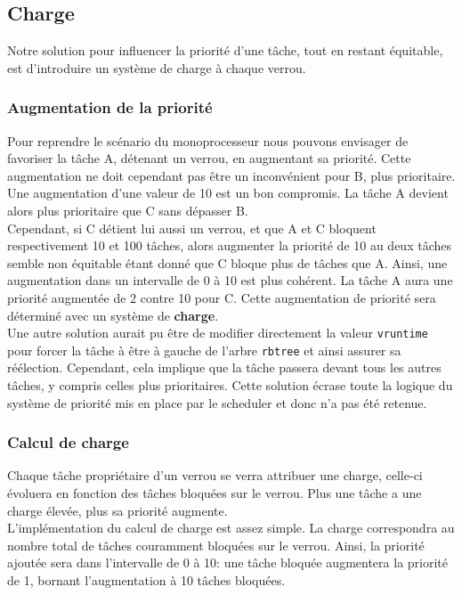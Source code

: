 \subsection{Charge}

Notre solution pour influencer la priorité d'une tâche, tout en restant équitable,
est d'introduire un système de charge à chaque verrou.

\subsubsection{Augmentation de la priorité}

Pour reprendre le scénario du monoprocesseur nous pouvons envisager de favoriser la tâche A, détenant un verrou,
en augmentant sa priorité. Cette augmentation ne doit cependant pas être un inconvénient pour B,
plus prioritaire. Une augmentation d'une valeur de 10 est un bon compromis. La tâche A
devient alors plus prioritaire que C sans dépasser B.
\\

Cependant, si C détient lui aussi un verrou, et que A et C bloquent respectivement 
10 et 100 tâches, alors augmenter la priorité de 10 au deux tâches semble non équitable
étant donné que C bloque plus de tâches que A. Ainsi, une augmentation dans un
intervalle de 0 à 10 est plus cohérent. La tâche A aura une priorité augmentée
de 2 contre 10 pour C. Cette augmentation de priorité sera déterminé
avec un système de \textbf{charge}.
\\

Une autre solution aurait pu être de modifier directement la valeur \verb|vruntime|
pour forcer la tâche à être à gauche de l'arbre \verb|rbtree| et ainsi assurer sa
réélection. Cependant, cela implique que la tâche passera devant tous les autres tâches,
y compris celles plus prioritaires. Cette solution écrase toute la logique du système
de priorité mis en place par le scheduler et donc n'a pas été retenue.


\subsubsection{Calcul de charge}

Chaque tâche propriétaire d'un verrou se verra attribuer une charge, celle-ci évoluera en fonction
des tâches bloquées sur le verrou. Plus une tâche a une charge élevée, plus sa priorité augmente.
\\

L'implémentation du calcul de charge est assez simple. 
La charge correspondra au nombre total de tâches couramment bloquées sur le verrou. 
Ainsi, la priorité ajoutée sera dans l'intervalle de 0 à 10: une tâche bloquée augmentera
la priorité de 1, bornant l'augmentation à 10 tâches bloquées.
\\



